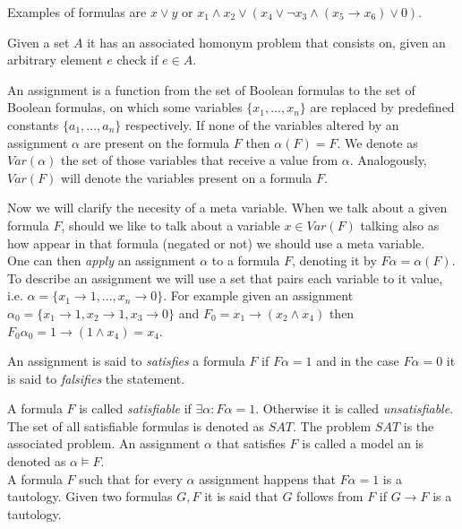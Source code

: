 Examples of formulas are $x\vee y$ or $x_1\wedge x_2 \vee  ( x_4 \vee \neg  x_3 \wedge (x_5\rightarrow x_6) \vee 0 )$. \\


\begin{definition} Given a set $A$ it has an associated homonym problem that consists on, given an arbitrary element $e$ check if $e\in A$.	
\end{definition}


\begin{definition}
	An assignment is a function from the set of Boolean formulas to the set of Boolean formulas, on which some variables $\{x_1,...,x_n \}$ are replaced by predefined constants $\{a_1,...,a_n\}$ respectively. If none of the variables altered by an assignment $\alpha$ are present on the formula $F$ then $\alpha(F) = F$. We denote as $Var(\alpha)$ the set of those variables that receive a value from $\alpha$. Analogously, $Var(F)$ will denote the variables present on a formula $F$.
      \end{definition}

      Now we will clarify the necesity of a meta variable. When we talk about a given formula $F$, should we like to talk about a variable $x \in Var(F)$ talking also as how appear in that formula (negated or not) we should use a meta variable. \\

	
	One can then \emph{apply} an assignment $\alpha$ to a formula $F$, denoting it by $F\alpha=\alpha(F)$. To describe an assignment we will use a set that pairs each variable to it value, i.e. $\alpha=\{x_1\to 1,...,x_n\to 0\}$. For example given an assignment $\alpha_0 = \{x_1 \to 1, x_2\to 1, x_3 \to 0\}$ and $F_0=x_1\to (x_2\wedge x_4)$ then  $F_0\alpha_0=1 \to (1\wedge x_4)= x_4$. \\
	
	\begin{definition}
	An assignment is said to \emph{satisfies}  a formula $F$ if $F\alpha=1$ and in the case $F  \alpha = 0 $ it is said to \emph{falsifies} the statement.
\end{definition}
	
	\begin{definition}
	A formula $F$ is called \emph{satisfiable} if $\exists \alpha : F\alpha = 1.$ Otherwise it is called \emph{unsatisfiable}. The set of all satisfiable formulas is denoted as $SAT$.  The problem $SAT$ is the associated problem. 	An assignment $\alpha$ that satisfies $F$ is called a model an is denoted as $\alpha \models F$.\\
	
	
	A formula $F$ such that for every  $\alpha$ assignment happens that $F\alpha=1$ is a tautology. Given two formulas $G,F$ it is said that $G$ follows from $F$ if $G\rightarrow F$ is a tautology. \\
\end{definition}
	
